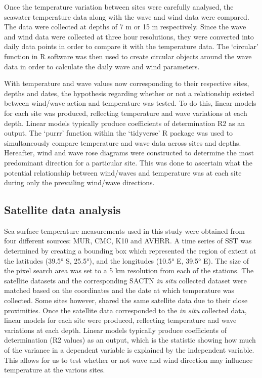 \documentclass[12pt,A4paper,]{article}
\begin{document}
Once the temperature variation between sites were carefully analysed,
the seawater temperature data along with the wave and wind data were
compared. The data were collected at depths of 7 m or 15 m respectively.
Since the wave and wind data were collected at three hour resolutions,
they were converted into daily data points in order to compare it with
the temperature data. The `circular' function in R software was then
used to create circular objects around the wave data in order to
calculate the daily wave and wind parameters.

With temperature and wave values now corresponding to their respective
sites, depths and dates, the hypothesis regarding whether or not a
relationship existed between wind/wave action and temperature was
tested. To do this, linear models for each site was produced, reflecting
temperature and wave variations at each depth. Linear models typically
produce coefficients of determination R2 as an output. The `purrr'
function within the `tidyverse' R package was used to simultaneously
compare temperature and wave data across sites and depths. Hereafter,
wind and wave rose diagrams were constructed to determine the most
predominant direction for a particular site. This was done to ascertain
what the potential relationship between wind/waves and temperature was
at each site during only the prevailing wind/wave directions.

\subsection{Satellite data analysis}\label{satellite-data-analysis}

Sea surface temperature measurements used in this study were obtained
from four different sources: MUR, CMC, K10 and AVHRR. A time series of
SST was determined by creating a bounding box which represented the
region of extent at the latitudes (39.5° S, 25.5°), and the longitudes
(10.5° E, 39.5° E). The size of the pixel search area was set to a 5 km
resolution from each of the stations. The satellite datasets and the
corresponding SACTN \emph{in situ} collected dataset were matched based
on the coordinates and the date at which temperature was collected. Some
sites however, shared the same satellite data due to their close
proximities. Once the satellite data corresponded to the \emph{in situ}
collected data, linear models for each site were produced, reflecting
temperature and wave variations at each depth. Linear models typically
produce coefficients of determination (R2 values) as an output, which is
the statistic showing how much of the variance in a dependent variable
is explained by the independent variable. This allows for us to test
whether or not wave and wind direction may influence temperature at the
various sites.
\end{document}
